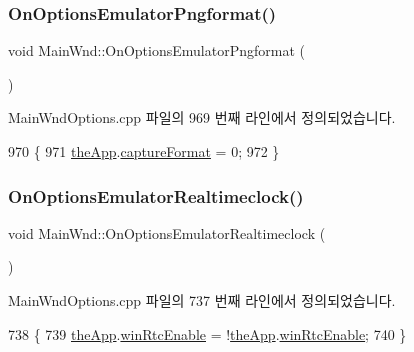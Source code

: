 \subsubsection{\texorpdfstring{On\+Options\+Emulator\+Pngformat()}{OnOptionsEmulatorPngformat()}}
{\footnotesize\ttfamily void Main\+Wnd\+::\+On\+Options\+Emulator\+Pngformat (\begin{DoxyParamCaption}{ }\end{DoxyParamCaption})\hspace{0.3cm}{\ttfamily [protected]}}



Main\+Wnd\+Options.\+cpp 파일의 969 번째 라인에서 정의되었습니다.


\begin{DoxyCode}
970 \{
971   \mbox{\hyperlink{_v_b_a_8cpp_a8095a9d06b37a7efe3723f3218ad8fb3}{theApp}}.\mbox{\hyperlink{class_v_b_a_a103f0b25433c57c4458a208a06799cf8}{captureFormat}} = 0;
972 \}
\end{DoxyCode}
\mbox{\label{class_main_wnd_a53770e7d481b904a0a3993d7c2e1dedb}} 
\subsubsection{\texorpdfstring{On\+Options\+Emulator\+Realtimeclock()}{OnOptionsEmulatorRealtimeclock()}}
{\footnotesize\ttfamily void Main\+Wnd\+::\+On\+Options\+Emulator\+Realtimeclock (\begin{DoxyParamCaption}{ }\end{DoxyParamCaption})\hspace{0.3cm}{\ttfamily [protected]}}



Main\+Wnd\+Options.\+cpp 파일의 737 번째 라인에서 정의되었습니다.


\begin{DoxyCode}
738 \{
739   \mbox{\hyperlink{_v_b_a_8cpp_a8095a9d06b37a7efe3723f3218ad8fb3}{theApp}}.\mbox{\hyperlink{class_v_b_a_ae289fc4c9e951e0844900c522c151170}{winRtcEnable}} = !\mbox{\hyperlink{_v_b_a_8cpp_a8095a9d06b37a7efe3723f3218ad8fb3}{theApp}}.\mbox{\hyperlink{class_v_b_a_ae289fc4c9e951e0844900c522c151170}{winRtcEnable}};
740 \}
\end{DoxyCode}
\mbox{\label{class_main_wnd_aed243489fe737a76bfdabee4a0a1b8f8}} 
